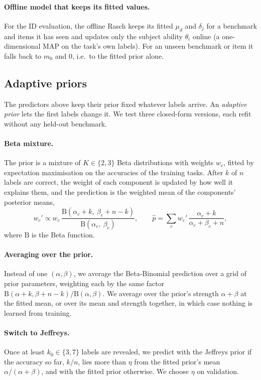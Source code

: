 \documentclass{article}
\begin{document}
\paragraph{Offline model that keeps its fitted values.} For the ID evaluation, the offline Rasch keeps its fitted $\mu_d$ and $\delta_j$ for a benchmark and items it has seen and updates only the subject ability $\theta_i$ online (a one-dimensional MAP on the task's own labels). For an unseen benchmark or item it falls back to $m_0$ and $0$, i.e.\ to the fitted prior alone.

\subsection{Adaptive priors}\label{sec:adaptive}
The predictors above keep their prior fixed whatever labels arrive. An \emph{adaptive prior} lets the first labels change it. We test three closed-form versions, each refit without any held-out benchmark.

\paragraph{Beta mixture.} The prior is a mixture of $K\in\{2,3\}$ Beta distributions with weights $w_c$, fitted by expectation maximisation on the accuracies of the training tasks. After $k$ of $n$ labels are correct, the weight of each component is updated by how well it explains them, and the prediction is the weighted mean of the components' posterior means,
\begin{equation}\label{eq:mixture}
w_c'\propto w_c\,\frac{\mathrm{B}(\alpha_c+k,\ \beta_c+n-k)}{\mathrm{B}(\alpha_c,\ \beta_c)},\qquad \hat p=\sum_c w_c'\,\frac{\alpha_c+k}{\alpha_c+\beta_c+n},
\end{equation}
where $\mathrm{B}$ is the Beta function.

\paragraph{Averaging over the prior.} Instead of one $(\alpha,\beta)$, we average the Beta-Binomial prediction over a grid of prior parameters, weighting each by the same factor $\mathrm{B}(\alpha+k,\beta+n-k)/\mathrm{B}(\alpha,\beta)$. We average over the prior's strength $\alpha+\beta$ at the fitted mean, or over its mean and strength together, in which case nothing is learned from training.

\paragraph{Switch to Jeffreys.} Once at least $k_0\in\{3,7\}$ labels are revealed, we predict with the Jeffreys prior if the accuracy so far, $k/n$, lies more than $\eta$ from the fitted prior's mean $\alpha/(\alpha+\beta)$, and with the fitted prior otherwise. We choose $\eta$ on validation.
\end{document}
